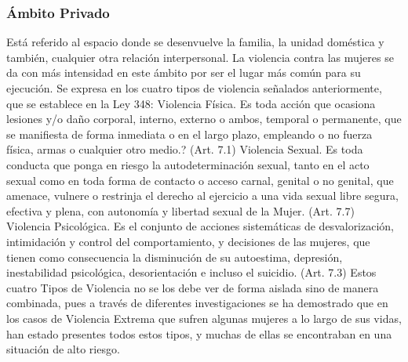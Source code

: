 \documentclass[11pt,letter]{article}
\begin{document}
\subsubsection{Ámbito Privado}
Está referido al espacio donde se desenvuelve la familia, la unidad doméstica y también, cualquier otra relación interpersonal.
La violencia contra las mujeres se da con más intensidad en este ámbito por ser el lugar más común para su ejecución. Se expresa en los cuatro tipos de violencia señalados anteriormente, que se establece en la Ley 348:
Violencia Física. Es toda acción que ocasiona lesiones y/o daño corporal, interno, externo o ambos, temporal o permanente, que se manifiesta de forma inmediata o en el largo plazo, empleando o no fuerza física, armas o
cualquier otro medio.? (Art. 7.1)
Violencia Sexual. Es toda conducta que ponga en riesgo la autodeterminación sexual, tanto en el acto sexual como en toda forma de contacto o acceso carnal, genital o no genital, que amenace, vulnere o restrinja el derecho al ejercicio a una vida sexual libre segura, efectiva y plena, con autonomía y libertad sexual de la Mujer. (Art. 7.7)
Violencia Psicológica. Es el conjunto de acciones sistemáticas de desvalorización, intimidación y control del comportamiento, y decisiones de las mujeres, que tienen como consecuencia la disminución de su autoestima, depresión, inestabilidad psicológica, desorientación e incluso el suicidio. (Art. 7.3) 
Estos cuatro Tipos de Violencia no se los debe ver de forma aislada sino de manera combinada, pues a través de diferentes investigaciones se ha demostrado que en los casos de Violencia Extrema que sufren algunas mujeres a lo largo de sus vidas, han estado presentes todos estos tipos, y muchas de ellas se encontraban en una situación de alto riesgo. 
\end{document}
